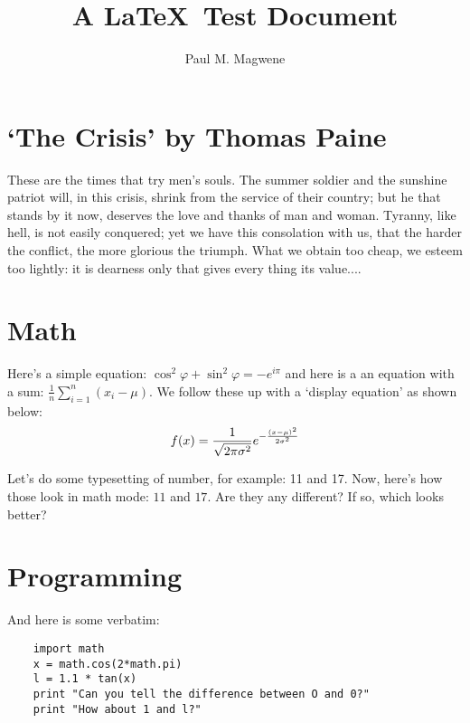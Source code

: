 
\newcommand{\normdistn}{\ensuremath{%
f(x) = 
\frac{1}{\sqrt{2\pi\sigma^2}} e^{-\frac{(x-\mu)^2}{2\sigma^2}}
}}

\newcommand{\varx}{\ensuremath{\frac{1}{n}\sum_{i=1}^{n}(x_i-\mu)}}


\title{A \LaTeX\ Test Document}
\author{Paul M. Magwene}


\maketitle
    
\section{`The Crisis' by Thomas Paine}

These are the times that try men's souls. The summer soldier and the sunshine patriot will, in this crisis, shrink from the service of their country; but he that stands by it now, deserves the love and thanks of man and woman. Tyranny, like hell, is not easily conquered; yet we have this consolation with us, that the harder the conflict, the more glorious the triumph. What we obtain too cheap, we esteem too lightly: it is dearness only that gives every thing its value....


\section{Math}

Here's a simple equation: $\cos^2 \varphi + \sin^2 \varphi = -e^{i\pi}$ and here is a an equation with a sum: \varx. We follow these up with a `display equation' as shown below:
\[
\normdistn
\]

Let's do some typesetting of number, for example: 11 and 17. Now, here's how those look in math mode: $11$ and $17$. Are they any different? If so, which looks better?

\section{Programming}

And here is some verbatim:
\begin{verbatim}
    import math
    x = math.cos(2*math.pi)
    l = 1.1 * tan(x)
    print "Can you tell the difference between O and 0?"
    print "How about 1 and l?"
\end{verbatim}  
    
